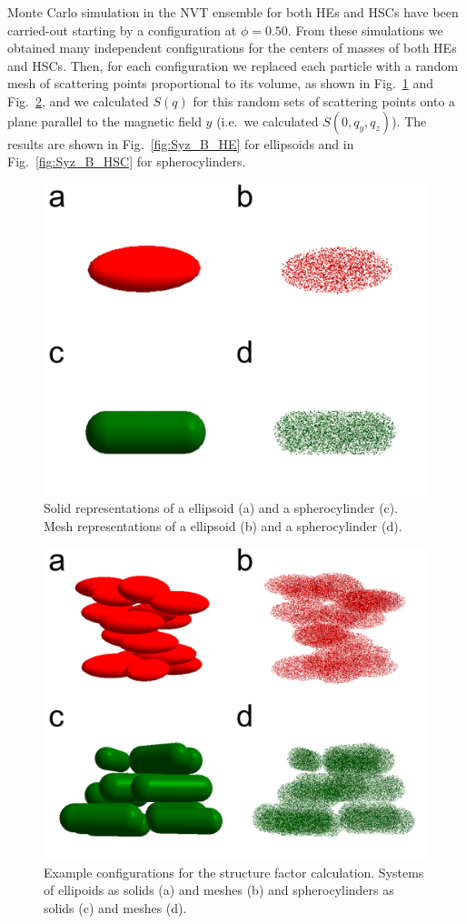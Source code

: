 \documentclass[aip,graphicx]{revtex4-1} %
\begin{document}
Monte Carlo simulation in the NVT ensemble for both HEs and HSCs have been carried-out 
starting by a configuration at $\phi = 0.50$.
From these simulations we obtained many independent configurations for the centers of masses of both HEs and HSCs. 
Then, for each configuration we replaced each particle with a random mesh of scattering points proportional to its volume, 
as shown in Fig.~\ref{fig:scatt_mod_single} and Fig.~\ref{fig:scatt_mod1}, and we calculated $S(q)$ for this random
sets of scattering points onto a plane parallel to the magnetic field $y$ (i.e.~we calculated $S(0, q_y, q_z)$). 
The results are shown in Fig.~\ref{fig:Syz_B_HE} for ellipsoids and in Fig.~\ref{fig:Syz_B_HSC} for spherocylinders.

\begin{figure}
    \centering
    \includegraphics[width=0.5\columnwidth]{Scatteringmodel_single.png}
    \caption{Solid representations of a ellipsoid (a) and a spherocylinder (c). Mesh representations of a ellipsoid (b) and a spherocylinder (d).}\label{fig:scatt_mod_single}
\end{figure}

\begin{figure}
    \centering
    \includegraphics[width=0.5\columnwidth]{Scatteringmodel1.png}
    \caption{Example configurations for the structure factor calculation. Systems of ellipoids as solids (a) and meshes (b) and spherocylinders as solids (c) and meshes (d).}\label{fig:scatt_mod1}
\end{figure}
\end{document}
